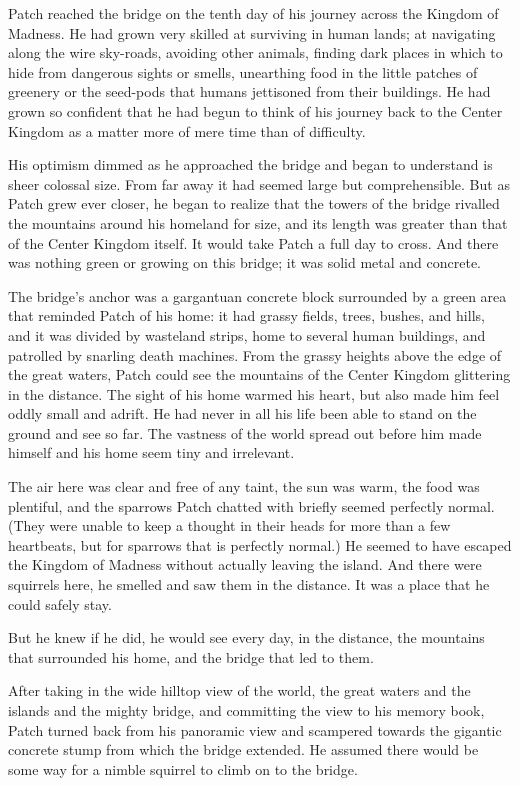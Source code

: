 \documentclass[12pt]{book}
\begin{document}
 Patch reached the bridge on the tenth day of his journey across the Kingdom of Madness. He had grown very skilled at surviving in human lands; at navigating along the wire sky-roads, avoiding other animals, finding dark places in which to hide from dangerous sights or smells, unearthing food in the little patches of greenery or the seed-pods that humans jettisoned from their buildings. He had grown so confident that he had begun to think of his journey back to the Center Kingdom as a matter more of mere time than of difficulty.\par
 His optimism dimmed as he approached the bridge and began to understand is sheer colossal size. From far away it had seemed large but comprehensible. But as Patch grew ever closer, he began to realize that the towers of the bridge rivalled the mountains around his homeland for size, and its length was greater than that of the Center Kingdom itself. It would take Patch a full day to cross. And there was nothing green or growing on this bridge; it was solid metal and concrete.\par
 The bridge's anchor was a gargantuan concrete block surrounded by a green area that reminded Patch of his home: it had grassy fields, trees, bushes, and hills, and it was divided by wasteland strips, home to several human buildings, and patrolled by snarling death machines. From the grassy heights above the edge of the great waters, Patch could see the mountains of the Center Kingdom glittering in the distance. The sight of his home warmed his heart, but also made him feel oddly small and adrift. He had never in all his life been able to stand on the ground and see so far. The vastness of the world spread out before him made himself and his home seem tiny and irrelevant.\par
 The air here was clear and free of any taint, the sun was warm, the food was plentiful, and the sparrows Patch chatted with briefly seemed perfectly normal. (They were unable to keep a thought in their heads for more than a few heartbeats, but for sparrows that is perfectly normal.) He seemed to have escaped the Kingdom of Madness without actually leaving the island. And there were squirrels here, he smelled and saw them in the distance. It was a place that he could safely stay.\par
But he knew if he did, he would see every day, in the distance, the mountains that surrounded his home, and the bridge that led to them.\par
After taking in the wide hilltop view of the world, the great waters and the islands and the mighty bridge, and committing the view to his memory book, Patch turned back from his panoramic view and scampered towards the gigantic concrete stump from which the bridge extended. He assumed there would be some way for a nimble squirrel to climb on to the bridge.\par
\end{document}
